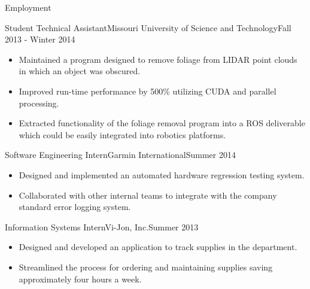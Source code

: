 \documentclass[]{mcdowellcv}
\begin{document}
\begin{cvsection}{Employment}
\begin{rockmech}
    \begin{cvsubsection}[2]{Student Technical Assistant}{Missouri University of Science and Technology}{Fall 2013 - Winter 2014}        
        \begin{itemize}
            \item Maintained a program designed to remove foliage from LIDAR point clouds in which an object was obscured.
            \item Improved run-time performance by 500\% utilizing CUDA and parallel processing.
            \item Extracted functionality of the foliage removal program into a ROS deliverable which could be easily integrated into robotics platforms.
        \end{itemize}
    \end{cvsubsection}
\end{rockmech}
    
\begin{garmin}
    \begin{cvsubsection}{Software Engineering Intern}{Garmin International}{Summer 2014}   
        \begin{itemize}
            \item Designed and implemented an automated hardware regression testing system.
            \item Collaborated with other internal teams to integrate with the company standard error logging system.
        \end{itemize}
    \end{cvsubsection}
\end{garmin}

\begin{vijon}
    \begin{cvsubsection}{Information Systems Intern}{Vi-Jon, Inc.}{Summer 2013}
        \begin{itemize}
            \item Designed and developed an application to track supplies in the department.
            \item Streamlined the process for ordering and maintaining supplies saving approximately four hours a week.
        \end{itemize}
    \end{cvsubsection}
\end{vijon}

\end{cvsection}
\end{document}
